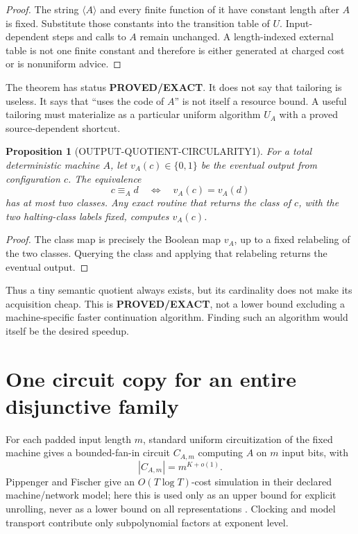 \documentclass[11pt]{article}
\newcommand{\PROVED}{\textcolor{proved}{\textbf{PROVED/EXACT}}}
\newtheorem{proposition}[theorem]{Proposition}
\begin{document}
\begin{proof}
The string $\langle A\rangle$ and every finite function of it have constant
length after $A$ is fixed.  Substitute those constants into the transition
table of $U$.  Input-dependent steps and calls to $A$ remain unchanged.  A
length-indexed external table is not one finite constant and therefore is
either generated at charged cost or is nonuniform advice.
\end{proof}

The theorem has status \PROVED.  It does not say that tailoring is useless.
It says that ``uses the code of $A$'' is not itself a resource bound.  A useful
tailoring must materialize as a particular uniform algorithm $U_A$ with a
proved source-dependent shortcut.

\begin{proposition}[OUTPUT-QUOTIENT-CIRCULARITY1]
For a total deterministic machine $A$, let $v_A(c)\in\{0,1\}$ be the eventual
output from configuration $c$.  The equivalence
\[
 c\equiv_A d\quad\Longleftrightarrow\quad v_A(c)=v_A(d)
\]
has at most two classes.  Any exact routine that returns the class of $c$, with
the two halting-class labels fixed, computes $v_A(c)$.
\end{proposition}

\begin{proof}
The class map is precisely the Boolean map $v_A$, up to a fixed relabeling of
the two classes.  Querying the class and applying that relabeling returns the
eventual output.
\end{proof}

Thus a tiny semantic quotient always exists, but its cardinality does not
make its acquisition cheap.  This is \PROVED, not a lower bound excluding a
machine-specific faster continuation algorithm.  Finding such an algorithm
would itself be the desired speedup.

\section{One circuit copy for an entire disjunctive family}

For each padded input length $m$, standard uniform circuitization of the fixed
machine gives a bounded-fan-in circuit $C_{A,m}$ computing $A$ on $m$ input
bits, with
\begin{equation}
 |C_{A,m}|=m^{K+o(1)}.                                  \tag{3}
\end{equation}
Pippenger and Fischer give an $O(T\log T)$-cost simulation in their declared
machine/network model; here this is used only as an upper bound for explicit
unrolling, never as a lower bound on all representations
\cite{pippengerfischer1979}.  Clocking and model transport contribute only
subpolynomial factors at exponent level.
\end{document}
